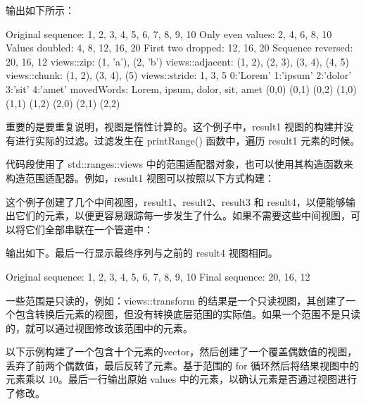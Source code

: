 输出如下所示：

\begin{shell}
Original sequence: 1, 2, 3, 4, 5, 6, 7, 8, 9, 10
Only even values: 2, 4, 6, 8, 10
Values doubled: 4, 8, 12, 16, 20
First two dropped: 12, 16, 20
Sequence reversed: 20, 16, 12
views::zip: (1, 'a'), (2, 'b')
views::adjacent: (1, 2), (2, 3), (3, 4), (4, 5)
views::chunk: (1, 2), (3, 4), (5)
views::stride: 1, 3, 5
0:'Lorem' 1:'ipsum' 2:'dolor' 3:'sit' 4:'amet'
movedWords: Lorem, ipsum, dolor, sit, amet
(0,0) (0,1) (0,2) (1,0) (1,1) (1,2) (2,0) (2,1) (2,2)
\end{shell}

重要的是要重复说明，视图是惰性计算的。这个例子中，result1 视图的构建并没有进行实际的过滤。过滤发生在 printRange() 函数中，遍历 result1 元素的时候。

代码段使用了 std::ranges::views 中的范围适配器对象，也可以使用其构造函数来构造范围适配器。例如，result1 视图可以按照以下方式构建：


这个例子创建了几个中间视图，result1、result2、result3 和 result4，以便能够输出它们的元素，以便更容易跟踪每一步发生了什么。如果不需要这些中间视图，可以将它们全部串联在一个管道中：


输出如下。最后一行显示最终序列与之前的 result4 视图相同。

\begin{shell}
Original sequence: 1, 2, 3, 4, 5, 6, 7, 8, 9, 10
Final sequence: 20, 16, 12
\end{shell}


一些范围是只读的，例如：views::transform 的结果是一个只读视图，其创建了一个包含转换后元素的视图，但没有转换底层范围的实际值。如果一个范围不是只读的，就可以通过视图修改该范围中的元素。

以下示例构建了一个包含十个元素的vector，然后创建了一个覆盖偶数值的视图，丢弃了前两个偶数值，最后反转了元素。基于范围的 for 循环然后将结果视图中的元素乘以 10。最后一行输出原始 values 中的元素，以确认元素是否通过视图进行了修改。

